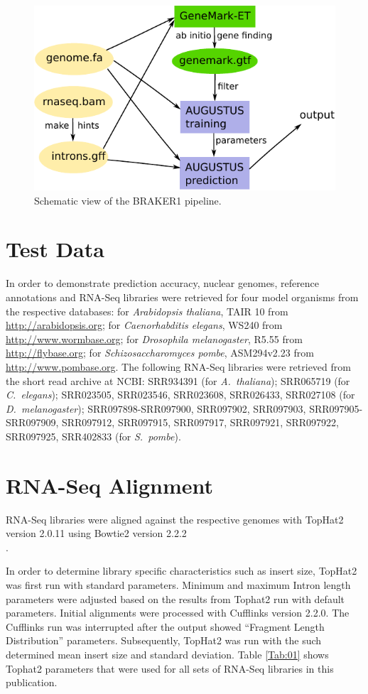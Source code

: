 \documentclass[a4paper,10pt]{report}
\begin{document}
\begin{figure}[!h]%
\centerline{\includegraphics[width=0.7\linewidth]{figs/Figure1.pdf}}
\caption{Schematic view of the BRAKER1 pipeline.}\label{pipeline}
\end{figure}

\section{Test Data}

In order to demonstrate prediction accuracy, nuclear genomes, reference annotations and RNA-Seq libraries were retrieved for four model organisms from the respective databases: for \textit{Arabidopsis thaliana}, TAIR 10 from \url{http://arabidopsis.org}; for \textit{Caenorhabditis elegans}, WS240 from \url{http://www.wormbase.org}; for \textit{Drosophila melanogaster}, R5.55 from \url{http://flybase.org}; for \textit{Schizosaccharomyces pombe}, ASM294v2.23 from \url{http://www.pombase.org}. The following RNA-Seq libraries were retrieved from the short read archive at NCBI: SRR934391 (for \textit{A.~thaliana}); SRR065719 (for \textit{C.~elegans}); SRR023505, SRR023546, SRR023608, SRR026433, SRR027108 (for \textit{D.~melanogaster}); SRR097898-SRR097900, SRR097902, SRR097903,
SRR097905-SRR097909, SRR097912, SRR097915, SRR097917, SRR097921, SRR097922, SRR097925, SRR402833 (for \textit{S.~pombe}).

\section{RNA-Seq Alignment}

RNA-Seq libraries were aligned against the respective genomes with TopHat2 version 2.0.11 \cite{TopHat2} using Bowtie2 version 2.2.2\\ \cite{Bowtie2}.

In order to determine library specific characteristics such as insert size, TopHat2 was first run with standard parameters. Minimum and maximum Intron length parameters were adjusted based on the results from Tophat2 run with default parameters. Initial alignments were processed with Cufflinks \cite{Cufflinks} version 2.2.0. The Cufflinks run was interrupted after the output showed ``Fragment Length Distribution'' parameters. Subsequently, TopHat2 was run with the such determined mean insert size and standard deviation.  Table \ref{Tab:01} shows Tophat2 parameters that were used for all sets of RNA-Seq libraries in this publication.
\end{document}
